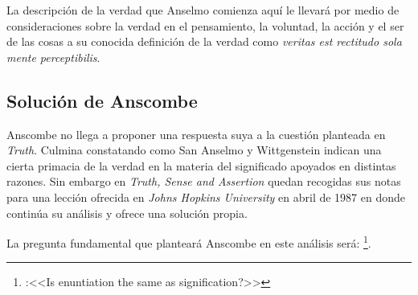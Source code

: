 La descripción de la verdad que Anselmo comienza aquí le llevará por medio de
consideraciones sobre la verdad en el pensamiento, la voluntad, la acción y el
ser de las cosas a su conocida definición de la verdad como \emph{veritas est
  rectitudo sola mente perceptibilis}\autocite[522]{anselm1952obras:deveritate}.

\subsection{Solución de Anscombe}
Anscombe no llega a proponer una respuesta suya a la cuestión planteada en
\emph{Truth}. Culmina constatando como San Anselmo y Wittgenstein indican una
cierta primacia de la verdad en la materia del significado apoyados en distintas
razones. Sin embargo en \emph{Truth, Sense and
  Assertion}\autocite{anscombe2015logic:tsa} quedan recogidas sus notas para una
lección ofrecida en \emph{Johns Hopkins University} en abril de
1987\autocite[Cf.~][264 n.~1]{anscombe2015logic:tsa} en donde continúa su
análisis y ofrece una solución propia.

La pregunta fundamental que planteará Anscombe en este análisis será:
\footnote{\cite[271]{anscombe2015logic:tsa}:<<Is enuntiation
  the same as signification?>>}.
